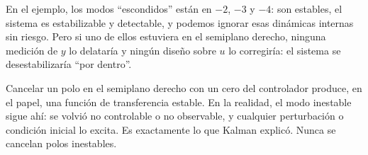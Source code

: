 En el ejemplo, los modos ``escondidos'' están en $-2$, $-3$ y $-4$: son estables, el sistema es estabilizable y detectable, y podemos ignorar esas dinámicas internas sin riesgo. Pero si uno de ellos estuviera en el semiplano derecho, ninguna medición de $y$ lo delataría y ningún diseño sobre $u$ lo corregiría: el sistema se desestabilizaría ``por dentro''.

\begin{cuidado}
Cancelar un polo en el semiplano derecho con un cero del controlador produce, en el papel, una función de transferencia estable. En la realidad, el modo inestable sigue ahí: se volvió no controlable o no observable, y cualquier perturbación o condición inicial lo excita. Es exactamente lo que Kalman explicó. Nunca se cancelan polos inestables.
\end{cuidado}
